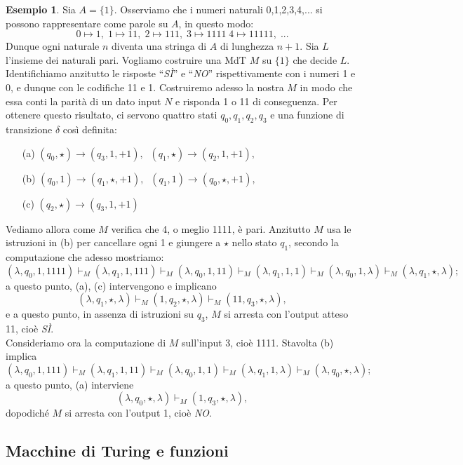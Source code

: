 \documentclass[12pt,a4paper]{report}
\theoremstyle{definition}
\newtheorem{es}[teo]{Esempio}  %
\begin{document}
\begin{es}
Sia $A=\{1\}$. Osserviamo che i numeri naturali 0,1,2,3,4,... si possono rappresentare come parole su $A$, in questo modo:
$$0 \mapsto 1, \; 1 \mapsto 11, \; 2 \mapsto 111, \; 3 \mapsto 1111 \; 4 \mapsto 11111, \; ...$$
Dunque ogni naturale $n$ diventa una stringa di $A$ di lunghezza $n+1$. Sia $L$ l'insieme dei naturali pari. Vogliamo costruire una MdT $M$ su $\{1\}$ che decide $L$. Identifichiamo anzitutto le risposte ``\emph{SÌ}'' e ``\emph{NO}'' rispettivamente con i numeri 1 e 0, e dunque con le codifiche 11 e 1. Costruiremo adesso la nostra $M$ in modo che essa conti la parità di un dato input $N$ e risponda 1 o 11 di conseguenza. Per ottenere questo risultato, ci servono quattro stati $q_0,q_1,q_2,q_3$ e una funzione di transizione $\delta$ così definita:

\begin{enumerate}
\item[(a)] $(q_0,\star) \rightarrow (q_3,1,+1), \; \; (q_1,\star) \rightarrow (q_2,1,+1),$
\item[(b)] $(q_0,1) \rightarrow (q_1,\star,+1), \; \; (q_1,1) \rightarrow (q_0,\star,+1),$
\item[(c)] $(q_2,\star) \rightarrow (q_3,1,+1)$
\end{enumerate}

Vediamo allora come $M$ verifica che 4, o meglio 1111, è pari. Anzitutto $M$ usa le istruzioni in (b) per cancellare ogni 1 e giungere a $\star$ nello stato $q_1$, secondo la computazione che adesso mostriamo:
$$(\lambda,q_0,1,1111) \vdash_M (\lambda,q_1,1,111) \vdash_M (\lambda,q_0,1,11) \vdash_M (\lambda,q_1,1,1) \vdash_M (\lambda,q_0,1,\lambda) \vdash_M (\lambda,q_1,\star,\lambda);$$
a questo punto, (a), (c) intervengono e implicano
$$(\lambda,q_1,\star,\lambda) \vdash_M (1,q_2,\star,\lambda) \vdash_M (11,q_3,\star,\lambda),$$ 
e a questo punto, in assenza di istruzioni su $q_3$, $M$ si arresta con l'output atteso 11, cioè \emph{SÌ}.\\
Consideriamo ora la computazione di $M$ sull'input 3, cioè 1111. Stavolta (b) implica 
$$(\lambda,q_0,1,111) \vdash_M (\lambda,q_1,1,11) \vdash_M (\lambda,q_0,1,1) \vdash_M (\lambda,q_1,1,\lambda) \vdash_M (\lambda,q_0,\star,\lambda);$$
a questo punto, (a) interviene
$$(\lambda,q_0,\star,\lambda) \vdash_M (1,q_3,\star,\lambda),$$
dopodiché $M$ si arresta con l'output 1, cioè \emph{NO}.
\end{es}


\subsection{Macchine di Turing e funzioni}
\end{document}
